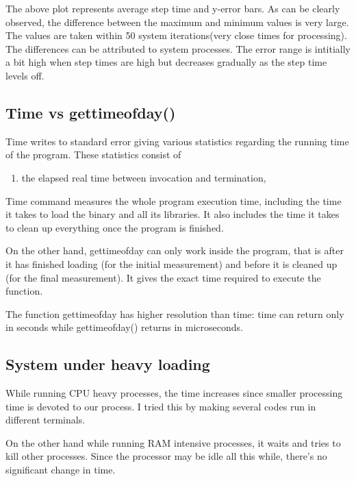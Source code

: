\documentclass[11pt]{article}
\begin{document}
The above plot represents average step time and y-error bars. As can be clearly observed, the difference between the maximum and minimum values is very large. The values are taken within 50 system iterations(very close times for processing). The differences can be attributed to system processes. The error range is intitially a bit high when step times are high but decreases gradually as the step time levels off.

\subsection{Time vs gettimeofday()}
Time writes to standard error giving various statistics regarding the running time of the program. These statistics consist of 
\begin{enumerate}
\item the elapsed real time between invocation and termination, 
\end{enumerate}
Time command measures the whole program execution time, including the time it takes to load the binary and all its libraries. It also includes the time it takes to clean up everything once the program is finished.

On the other hand, gettimeofday can only work inside the program, that is after it has finished loading (for the initial measurement) and before it is cleaned up (for the final measurement). It gives the exact time required to execute the function.

The function gettimeofday has higher resolution than time: time can return only in seconds while gettimeofday() returns in microseconds.

\subsection{System under heavy loading}
While running CPU heavy processes, the time increases since smaller processing time is devoted to our process. I tried this by making several codes run in different terminals.

On the other hand while running RAM intensive processes, it waits and tries to kill other processes. Since the processor may be idle all this while, there's no significant change in time. 
\end{document}
